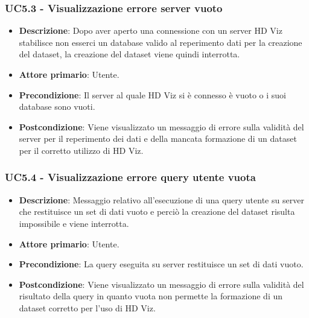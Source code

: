 \subsubsection{UC5.3 - Visualizzazione errore server vuoto}
\label{ssub:uc5.3}
\begin{itemize}
    \item \textbf{Descrizione}: Dopo aver aperto una connessione con un server HD Viz stabilisce non esserci
                                un database valido al reperimento dati per la creazione del dataset, la creazione
                                del dataset viene quindi interrotta.

    \item \textbf{Attore primario}: Utente.
    
    \item \textbf{Precondizione}:   Il server al quale HD Viz si è connesso è vuoto o i suoi database sono vuoti.

    \item \textbf{Postcondizione}:   Viene visualizzato un messaggio di errore sulla validità del server per il reperimento
                                    dei dati e della mancata formazione di un dataset per il corretto utilizzo di HD Viz.


\end{itemize}


\subsubsection{UC5.4 - Visualizzazione errore query utente vuota}
\label{ssub:uc5.4}
\begin{itemize}
    \item \textbf{Descrizione}: Messaggio relativo all'esecuzione di una query utente su server che restituisce 
                                un set di dati vuoto e
                                perciò la creazione del dataset risulta impossibile e viene interrotta.

    \item \textbf{Attore primario}: Utente.
    
    \item \textbf{Precondizione}:   La query eseguita su server restituisce un set di dati vuoto.

    \item \textbf{Postcondizione}:   Viene visualizzato un messaggio di errore sulla validità del risultato della query 
                                        in quanto vuota non permette la formazione di un dataset corretto per l'uso di HD Viz.


\end{itemize}